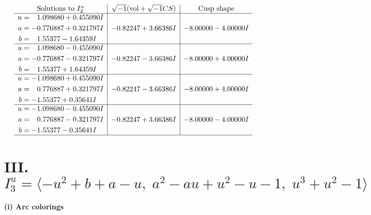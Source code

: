 \documentclass[1p]{elsarticle_modified}
\theoremstyle{definition}
\newcommand{\I}{\sqrt{-1}}
\begin{document}
$$\begin{array}{c|c|c}  
\text{Solutions to }I^u_{2}& \I (\text{vol} + \sqrt{-1}CS) & \text{Cusp shape}\\
 \hline 
\begin{aligned}
u &= \phantom{-}1.098680 + 0.455090 I \\
a &= -0.776887 + 0.321797 I \\
b &= \phantom{-}1.55377 - 1.64359 I\end{aligned}
 & -0.82247 + 3.66386 I & -8.00000 - 4.00000 I \\ \hline\begin{aligned}
u &= \phantom{-}1.098680 - 0.455090 I \\
a &= -0.776887 - 0.321797 I \\
b &= \phantom{-}1.55377 + 1.64359 I\end{aligned}
 & -0.82247 - 3.66386 I & -8.00000 + 4.00000 I \\ \hline\begin{aligned}
u &= -1.098680 + 0.455090 I \\
a &= \phantom{-}0.776887 + 0.321797 I \\
b &= -1.55377 + 0.35641 I\end{aligned}
 & -0.82247 - 3.66386 I & -8.00000 + 4.00000 I \\ \hline\begin{aligned}
u &= -1.098680 - 0.455090 I \\
a &= \phantom{-}0.776887 - 0.321797 I \\
b &= -1.55377 - 0.35641 I\end{aligned}
 & -0.82247 + 3.66386 I & -8.00000 - 4.00000 I\\
 \hline 
 \end{array}$$\newpage\newpage\renewcommand{\arraystretch}{1}
\centering \section*{III. $I^u_{3}= \langle - u^2+b+a- u,\;a^2- a u+u^2- u-1,\;u^3+u^2-1 \rangle$}
\flushleft \textbf{(i) Arc colorings}\\
\end{document}
